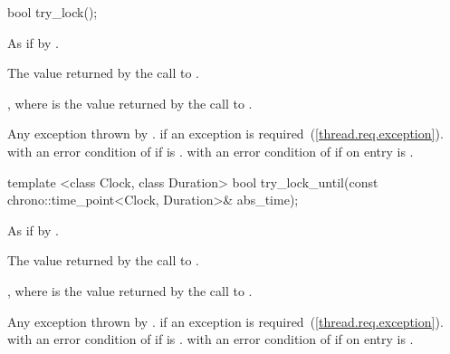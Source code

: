 %
%
\begin{itemdecl}
bool try_lock();
\end{itemdecl}

\begin{itemdescr}
\pnum
\effects As if by .

\pnum
\returns The value returned by the call to .

\pnum
\postconditions {}, where  is the value returned by
the call to .

\pnum
\throws Any exception thrown by .
 if an exception is required~(\ref{thread.req.exception}).
 with an error condition of
 if  is .
 with an error condition of
 if on entry  is .

\end{itemdescr}

%
%
\begin{itemdecl}
template <class Clock, class Duration>
  bool
  try_lock_until(const chrono::time_point<Clock, Duration>& abs_time);
\end{itemdecl}

\begin{itemdescr}
\pnum
\effects As if by .

\pnum
\returns The value returned by the call to
.

\pnum
\postconditions {}, where  is the value returned by
the call to .

\pnum
\throws Any exception thrown by .
 if an exception is required~(\ref{thread.req.exception}).
 with an error condition of
 if  is .
 with an error condition of
 if on entry  is .
\end{itemdescr}


